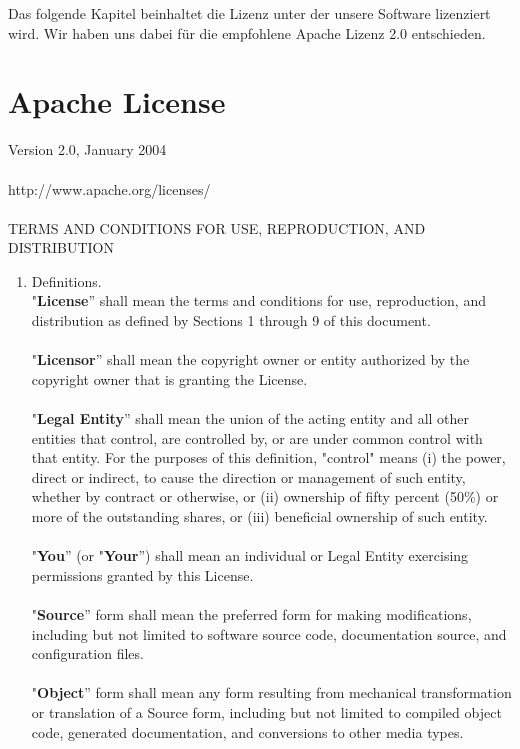 Das folgende Kapitel beinhaltet die Lizenz unter der unsere Software lizenziert wird.
Wir haben uns dabei für die empfohlene Apache Lizenz 2.0 entschieden.
\section{Apache License}
Version 2.0, January 2004\\\\
http://www.apache.org/licenses/\\\\
TERMS AND CONDITIONS FOR USE, REPRODUCTION, AND DISTRIBUTION\\
\begin{enumerate}
\item Definitions.\hfill \\
"\textbf{License}'' shall mean the terms and conditions for use, reproduction, and distribution as defined by Sections 1 through 9 of this document.\\\\
"\textbf{Licensor}'' shall mean the copyright owner or entity authorized by the copyright owner that is granting the License.\\\\
"\textbf{Legal Entity}'' shall mean the union of the acting entity and all other entities that control, are controlled by, or are under common control with that entity. For the purposes of this definition, "control" means (i) the power, direct or indirect, to cause the direction or management of such entity, whether by contract or otherwise, or (ii) ownership of fifty percent (50\%) or more of the outstanding shares, or (iii) beneficial ownership of such entity.\\\\
"\textbf{You}'' (or "\textbf{Your}'') shall mean an individual or Legal Entity exercising permissions granted by this License.\\\\
"\textbf{Source}'' form shall mean the preferred form for making modifications, including but not limited to software source code, documentation source, and configuration files.\\\\
"\textbf{Object}'' form shall mean any form resulting from mechanical transformation or translation of a Source form, including but not limited to compiled object code, generated documentation, and conversions to other media types.\\\\

\end{enumerate}
